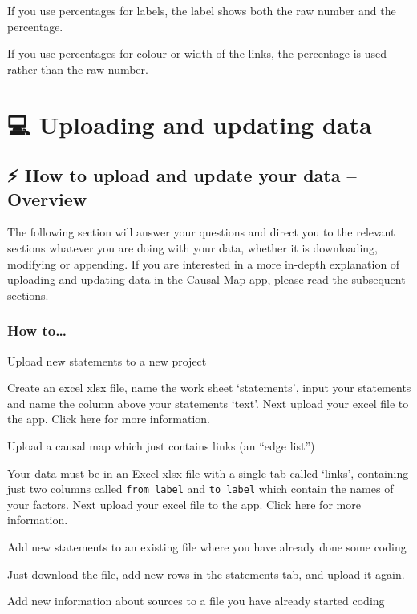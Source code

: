 \documentclass[
]{book}
\begin{document}
If you use percentages for labels, the label shows both the raw number and the percentage.

If you use percentages for colour or width of the links, the percentage is used rather than the raw number.

\hypertarget{part-uploading-and-updating-data}{%
\part{💻 Uploading and updating data}\label{part-uploading-and-updating-data}}

\hypertarget{uploadandupdate}{%
\chapter{⚡ How to upload and update your data -- Overview}\label{uploadandupdate}}

The following section will answer your questions and direct you to the relevant sections whatever you are doing with your data, whether it is downloading, modifying or appending. If you are interested in a more in-depth explanation of uploading and updating data in the Causal Map app, please read the subsequent sections.

\hypertarget{how-to}{%
\section{How to\ldots{}}\label{how-to}}

Upload new statements to a new project

Create an excel xlsx file, name the work sheet `statements', input your statements and name the column above your statements `text'. Next upload your excel file to the app. Click here for more information.

Upload a causal map which just contains links (an ``edge list'')

Your data must be in an Excel xlsx file with a single tab called `links', containing just two columns called \texttt{from\_label} and \texttt{to\_label} which contain the names of your factors. Next upload your excel file to the app. Click here for more information.

Add new statements to an existing file where you have already done some coding

Just download the file, add new rows in the statements tab, and upload it again.

Add new information about sources to a file you have already started coding
\end{document}
